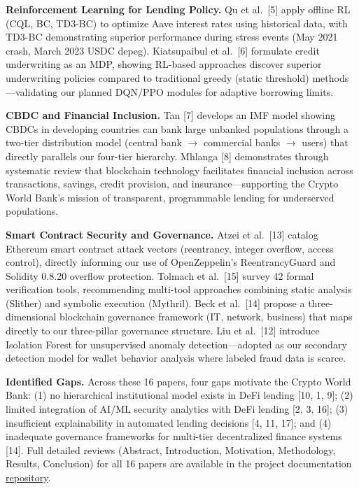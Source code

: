 \documentclass[11pt,a4paper]{article}
\begin{document}
\begin{doublespacing}
\hangindent=0.5in \textbf{Reinforcement Learning for Lending Policy.} Qu et al.~[5] apply offline RL (CQL, BC, TD3-BC) to optimize Aave interest rates using historical data, with TD3-BC demonstrating superior performance during stress events (May 2021 crash, March 2023 USDC depeg). Kiatsupaibul et al.~[6] formulate credit underwriting as an MDP, showing RL-based approaches discover superior underwriting policies compared to traditional greedy (static threshold) methods—validating our planned DQN/PPO modules for adaptive borrowing limits.

\hangindent=0.5in \textbf{CBDC and Financial Inclusion.} Tan [7] develops an IMF model showing CBDCs in developing countries can bank large unbanked populations through a two-tier distribution model (central bank $\to$ commercial banks $\to$ users) that directly parallels our four-tier hierarchy. Mhlanga [8] demonstrates through systematic review that blockchain technology facilitates financial inclusion across transactions, savings, credit provision, and insurance—supporting the Crypto World Bank's mission of transparent, programmable lending for underserved populations.

\hangindent=0.5in \textbf{Smart Contract Security and Governance.} Atzei et al.~[13] catalog Ethereum smart contract attack vectors (reentrancy, integer overflow, access control), directly informing our use of OpenZeppelin's ReentrancyGuard and Solidity 0.8.20 overflow protection. Tolmach et al.~[15] survey 42 formal verification tools, recommending multi-tool approaches combining static analysis (Slither) and symbolic execution (Mythril). Beck et al.~[14] propose a three-dimensional blockchain governance framework (IT, network, business) that maps directly to our three-pillar governance structure. Liu et al.~[12] introduce Isolation Forest for unsupervised anomaly detection—adopted as our secondary detection model for wallet behavior analysis where labeled fraud data is scarce.

\hangindent=0.5in \textbf{Identified Gaps.} Across these 16 papers, four gaps motivate the Crypto World Bank: (1) no hierarchical institutional model exists in DeFi lending [10, 1, 9]; (2) limited integration of AI/ML security analytics with DeFi lending [2, 3, 16]; (3) insufficient explainability in automated lending decisions [4, 11, 17]; and (4) inadequate governance frameworks for multi-tier decentralized finance systems [14]. Full detailed reviews (Abstract, Introduction, Motivation, Methodology, Results, Conclusion) for all 16 papers are available in the project documentation \href{https://github.com/Yuvraajrahman/Cryto-World-Bank/tree/main/Documentation/LiteratureReviews}{repository}.


\end{doublespacing}
\end{document}
